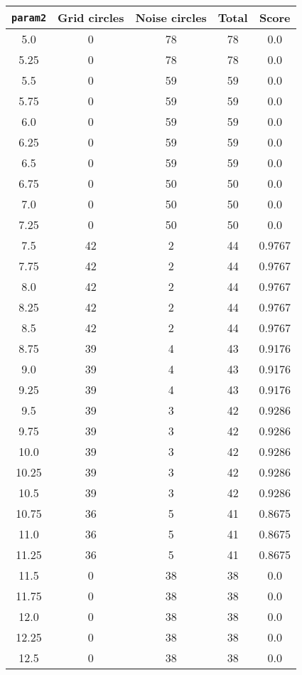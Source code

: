 \documentclass[letterpaper, 12pt]{article}
\begin{document}
\begin{longtable}{|c|c|c|c|c|}
\hline
\textbf{\texttt{param2}} & \textbf{Grid circles} & \textbf{Noise circles} & \textbf{Total} & \textbf{Score} \\
\hline
5.0 & 0 & 78 & 78 & 0.0 \\
\hline
5.25 & 0 & 78 & 78 & 0.0 \\
\hline
5.5 & 0 & 59 & 59 & 0.0 \\
\hline
5.75 & 0 & 59 & 59 & 0.0 \\
\hline
6.0 & 0 & 59 & 59 & 0.0 \\
\hline
6.25 & 0 & 59 & 59 & 0.0 \\
\hline
6.5 & 0 & 59 & 59 & 0.0 \\
\hline
6.75 & 0 & 50 & 50 & 0.0 \\
\hline
7.0 & 0 & 50 & 50 & 0.0 \\
\hline
7.25 & 0 & 50 & 50 & 0.0 \\
\hline
7.5 & 42 & 2 & 44 & 0.9767 \\
\hline
7.75 & 42 & 2 & 44 & 0.9767 \\
\hline
8.0 & 42 & 2 & 44 & 0.9767 \\
\hline
8.25 & 42 & 2 & 44 & 0.9767 \\
\hline
8.5 & 42 & 2 & 44 & 0.9767 \\
\hline
8.75 & 39 & 4 & 43 & 0.9176 \\
\hline
9.0 & 39 & 4 & 43 & 0.9176 \\
\hline
9.25 & 39 & 4 & 43 & 0.9176 \\
\hline
9.5 & 39 & 3 & 42 & 0.9286 \\
\hline
9.75 & 39 & 3 & 42 & 0.9286 \\
\hline
10.0 & 39 & 3 & 42 & 0.9286 \\
\hline
10.25 & 39 & 3 & 42 & 0.9286 \\
\hline
10.5 & 39 & 3 & 42 & 0.9286 \\
\hline
10.75 & 36 & 5 & 41 & 0.8675 \\
\hline
11.0 & 36 & 5 & 41 & 0.8675 \\
\hline
11.25 & 36 & 5 & 41 & 0.8675 \\
\hline
11.5 & 0 & 38 & 38 & 0.0 \\
\hline
11.75 & 0 & 38 & 38 & 0.0 \\
\hline
12.0 & 0 & 38 & 38 & 0.0 \\
\hline
12.25 & 0 & 38 & 38 & 0.0 \\
\hline
12.5 & 0 & 38 & 38 & 0.0 \\
\hline

\end{longtable}
\end{document}
